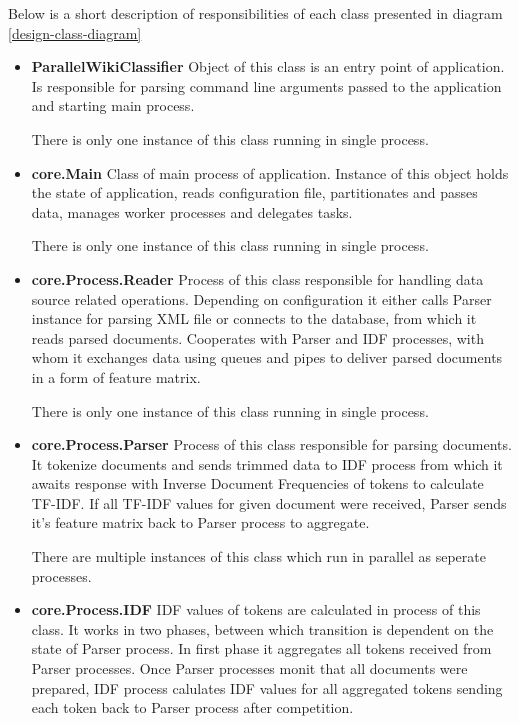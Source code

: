 Below is a short description of responsibilities of each class presented in diagram \ref{design-class-diagram}

\begin{itemize}
	\item \textbf{ParallelWikiClassifier}\newline
	Object of this class is an entry point of application. Is responsible for parsing command line arguments passed to the application and starting main process.
	
	There is only one instance of this class running in single process.
	
	\item \textbf{core.Main}\newline
	Class of main process of application. Instance of this object holds the state of application, reads configuration file, partitionates and passes data, manages worker processes and delegates tasks. 
	
	There is only one instance of this class running in single process.
	
	\item \textbf{core.Process.Reader}\newline
	Process of this class responsible for handling data source related operations. Depending on configuration it either calls Parser instance for parsing XML file or connects to the database, from which it reads parsed documents. Cooperates with Parser and IDF processes, with whom it exchanges data using queues and pipes to deliver parsed documents in a form of feature matrix.
	
	There is only one instance of this class running in single process.
	
	\item \textbf{core.Process.Parser}\newline
	Process of this class responsible for parsing documents. It tokenize documents and sends trimmed data to IDF process from which it awaits response with Inverse Document Frequencies of tokens to calculate TF-IDF. If all TF-IDF values for given document were received, Parser sends it's feature matrix back to Parser process to aggregate.
	
	There are multiple instances of this class which run in parallel as seperate processes.
	
	\item \textbf{core.Process.IDF}\newline
	IDF values of tokens are calculated in process of this class. It works in two phases, between which transition is dependent on the state of Parser process. In first phase it aggregates all tokens received from Parser processes. Once Parser processes monit that all documents were prepared, IDF process calulates IDF values for all aggregated tokens sending each token back to Parser process after competition.
	

\end{itemize}
